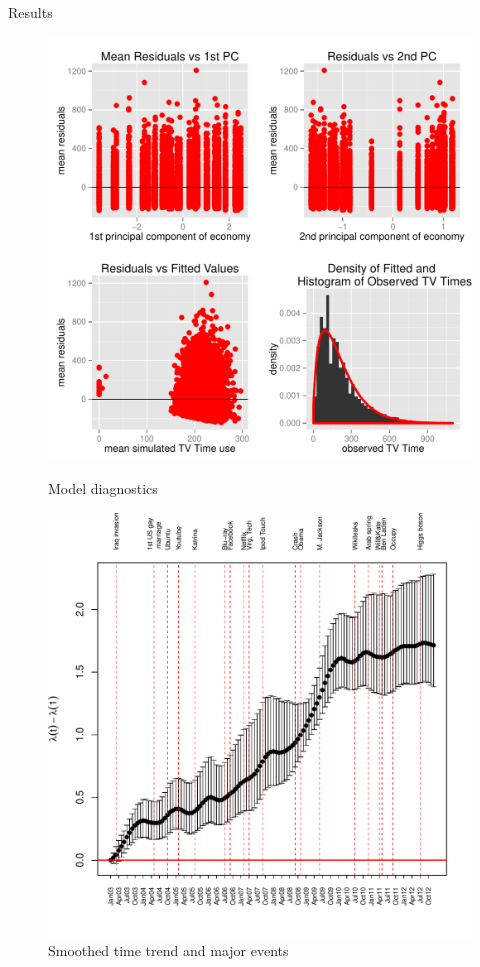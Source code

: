 \documentclass[final]{beamer}
\newcounter{acolumn}%
\begin{document}
\begin{frame}
\begin{acolumns}[t]
\begin{column}{.72\linewidth}
\begin{block}{Results}
\begin{figure}
\begin{minipage}{0.25\textwidth}
            \end{minipage}%
      \begin{minipage}{0.25\textwidth}
      \centering
      \includegraphics{validation.pdf}
      \caption{Model diagnostics}
      \end{minipage}%
      \begin{minipage}{0.25\textwidth}
       \centering
       \includegraphics{time_trend.pdf}
       \caption{Smoothed time trend and major events}
      \end{minipage}%
                      

\end{figure}
\end{block}
\end{column}
\end{acolumns}
\end{frame}
\end{document}
